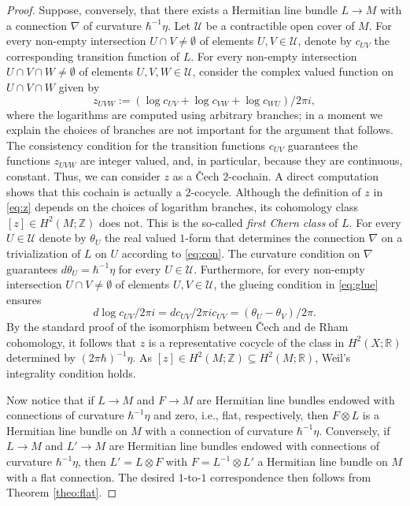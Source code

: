 \documentclass{amsart}
\theoremstyle{definition}
\theoremstyle{remark}
\numberwithin{equation}{section}
\newcommand{\<}{{\langle}}
\renewcommand{\>}{{\rangle}}
\begin{document}
\begin{proof}
    Suppose, conversely, that there exists
    a Hermitian line bundle $L \to M$ with a connection $\nabla$ of curvature $\hbar^{-1}\eta$. Let $\mathcal{U}$ be a contractible open cover of $M$. For every non-empty intersection $U \cap V \neq \emptyset$ of elements $U,V \in \mathcal{U}$, denote by $c_{UV}$ the corresponding transition function of $L$. For every non-empty intersection $U\cap V \cap W \neq \emptyset$ of elements $U,V,W \in \mathcal{U}$, consider the complex valued function on $U \cap V \cap W$ given by
    \begin{equation}
    \label{eq:z}
    z_{UVW} := (\log c_{UV} + \log c_{VW} + \log c_{WU})/2\pi i,
    \end{equation}
    where the logarithms are computed using arbitrary branches; in a moment we explain the choices of branches are not important for the argument that follows. The consistency condition for the transition functions $c_{UV}$ guarantees the functions $z_{UVW}$ are integer valued, and, in particular, because they are continuous, constant. Thus, we can consider $z$ as a \v{C}ech $2$-cochain. A direct computation shows that this cochain is actually a $2$-cocycle. Although the definition of $z$ in \eqref{eq:z} depends on the choices of logarithm branches, its cohomology class $[z] \in H^2(M;\mathbb{Z})$ does not. This is the so-called \textit{first Chern class} of $L$. For every $U \in \mathcal{U}$ denote by $\theta_U$ the real valued $1$-form that determines the connection $\nabla$ on a trivialization of $L$ on $U$ according to \eqref{eq:con}. The curvature condition on $\nabla$ guarantees $d\theta_U = \hbar^{-1}\eta$ for every $U \in \mathcal{U}$. Furthermore, for every non-empty intersection $U \cap V \neq \emptyset$ of elements $U,V \in \mathcal{U}$, the glueing condition in \eqref{eq:glue} ensures
    \[
    d \log c_{UV}/2\pi i = dc_{UV}/2\pi i c_{UV} = (\theta_U - \theta_V)/2\pi.
    \]
    By the standard proof of the isomorphism between \v{C}ech and de Rham cohomology, it follows that $z$ is a representative cocycle of the class in $H^2(X;\mathbb{R})$ determined by $(2\pi \hbar)^{-1}\eta$. As $[z] \in H^2(M;\mathbb{Z})\subseteq H^2(M;\mathbb{R})$, Weil's integrality condition holds.

    Now notice that if $L \to M$ and $F \to M$ are Hermitian line bundles endowed with connections of curvature $\hbar^{-1} \eta$ and zero, i.e., flat, respectively, then $F \otimes L$ is a Hermitian line bundle on $M$ with a connection of curvature $\hbar^{-1} \eta$. Conversely, if $L \to M$ and $L' \to M$ are Hermitian line bundles endowed with connections of curvature $\hbar^{-1} \eta$, then $L' = L \otimes F$ with $F = L^{-1} \otimes L'$ a Hermitian line bundle on $M$ with a flat connection. The desired $1$-to-$1$ correspondence then follows from Theorem \ref{theo:flat}.
\end{proof}
\end{document}
